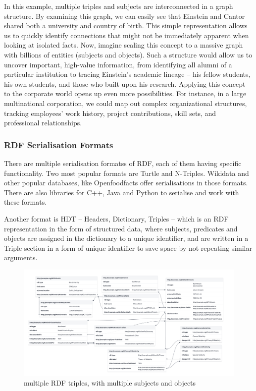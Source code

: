 In this example, multiple triples and subjects are interconnected in a graph structure. By examining this graph, we can easily see that Einstein and Cantor shared both a university and country of birth. This simple representation allows us to quickly identify connections that might not be immediately apparent when looking at isolated facts. Now, imagine scaling this concept to a massive graph with billions of entities (subjects and objects). Such a structure would allow us to uncover important, high-value information, from identifying all alumni of a particular institution to tracing Einstein's academic lineage – his fellow students, his own students, and those who built upon his research. Applying this concept to the corporate world opens up even more possibilities. For instance, in a large multinational corporation, we could map out complex organizational structures, tracking employees' work history, project contributions, skill sets, and professional relationships.

\subsubsection{RDF Serialisation Formats}

There are multiple serialisation formatss of RDF, each of them having specific functionality. Two most popular formats are Turtle and N-Triples. Wikidata and other popular databases, like Openfoodfacts \citep{openfoodfacts} offer serialisations in those formats. There are also libraries for C++, Java and Python to serialise and work with these formats. 


Another format is HDT – Headers, Dictionary, Triples – which is an RDF representation in the form of structured data, where subjects, predicates and objects are assigned in the dictionary to a unique identifier, and are written in a Triple section in a form of unique identifier to save space by not repeating similar arguments.

\begin{figure}[htbp]
    \centering
    \includegraphics[width=1\textwidth]{5.png}
    \caption{multiple RDF triples, with multiple subjects and objects}
    \label{fig:image5}
\end{figure}

